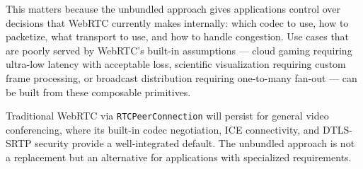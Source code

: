 \documentclass[11pt]{article}
\begin{document}
This matters because the unbundled approach gives applications control over
decisions that WebRTC currently makes internally: which codec to use, how to
packetize, what transport to use, and how to handle congestion. Use cases
that are poorly served by WebRTC's built-in assumptions --- cloud gaming
requiring ultra-low latency with acceptable loss, scientific visualization
requiring custom frame processing, or broadcast distribution requiring
one-to-many fan-out --- can be built from these composable primitives.

Traditional WebRTC via \texttt{RTCPeerConnection} will persist for general
video conferencing, where its built-in codec negotiation, ICE connectivity,
and DTLS-SRTP security provide a well-integrated default. The unbundled
approach is not a replacement but an alternative for applications with
specialized requirements.
\end{document}
